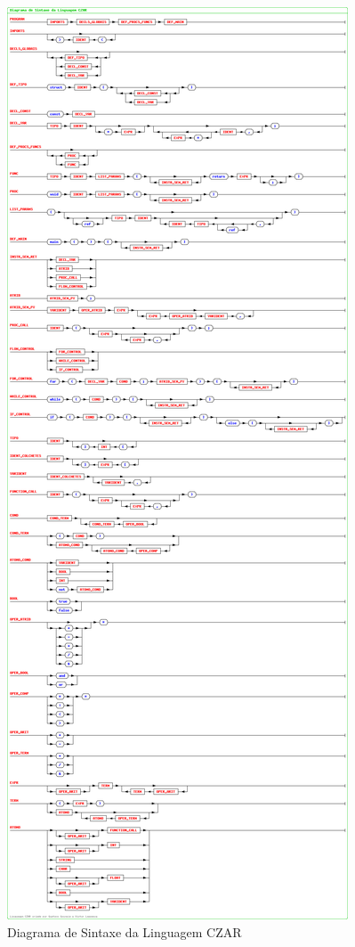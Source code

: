 \begin{figure}
	\centering 
	\includegraphics[width=\textwidth, clip, trim=0 0 0 1435px]{images/diagrama-sintaxe.png} 
	\caption{Diagrama de Sintaxe da Linguagem CZAR}
	\label{fig:diagrama-sintaxe-2}
\end{figure}
